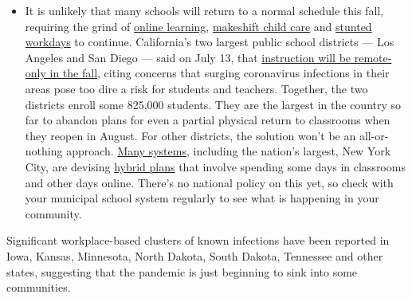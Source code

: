 \begin{itemize}
  \begin{itemize}
  \tightlist
  \item
    It is unlikely that many schools will return to a normal schedule
    this fall, requiring the grind of
    \href{https://www.nytimes3xbfgragh.onion/2020/06/05/us/coronavirus-education-lost-learning.html?action=click\&pgtype=Article\&state=default\&region=MAIN_CONTENT_3\&context=storylines_faq}{online
    learning},
    \href{https://www.nytimes3xbfgragh.onion/2020/05/29/us/coronavirus-child-care-centers.html?action=click\&pgtype=Article\&state=default\&region=MAIN_CONTENT_3\&context=storylines_faq}{makeshift
    child care} and
    \href{https://www.nytimes3xbfgragh.onion/2020/06/03/business/economy/coronavirus-working-women.html?action=click\&pgtype=Article\&state=default\&region=MAIN_CONTENT_3\&context=storylines_faq}{stunted
    workdays} to continue. California's two largest public school
    districts --- Los Angeles and San Diego --- said on July 13, that
    \href{https://www.nytimes3xbfgragh.onion/2020/07/13/us/lausd-san-diego-school-reopening.html?action=click\&pgtype=Article\&state=default\&region=MAIN_CONTENT_3\&context=storylines_faq}{instruction
    will be remote-only in the fall}, citing concerns that surging
    coronavirus infections in their areas pose too dire a risk for
    students and teachers. Together, the two districts enroll some
    825,000 students. They are the largest in the country so far to
    abandon plans for even a partial physical return to classrooms when
    they reopen in August. For other districts, the solution won't be an
    all-or-nothing approach.
    \href{https://bioethics.jhu.edu/research-and-outreach/projects/eschool-initiative/school-policy-tracker/}{Many
    systems}, including the nation's largest, New York City, are
    devising
    \href{https://www.nytimes3xbfgragh.onion/2020/06/26/us/coronavirus-schools-reopen-fall.html?action=click\&pgtype=Article\&state=default\&region=MAIN_CONTENT_3\&context=storylines_faq}{hybrid
    plans} that involve spending some days in classrooms and other days
    online. There's no national policy on this yet, so check with your
    municipal school system regularly to see what is happening in your
    community.
  \end{itemize}
\end{itemize}

Significant workplace-based clusters of known infections have been
reported in Iowa, Kansas, Minnesota, North Dakota, South Dakota,
Tennessee and other states, suggesting that the pandemic is just
beginning to sink into some communities.

